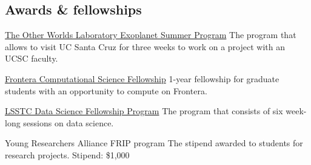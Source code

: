 \documentclass[10pt]{article} %
\begin{document}
\begin{paracol}{1}


\section{Awards \& fellowships}





	
	{\href{https://owl.ucsc.edu/summer/}{The Other Worlds Laboratory Exoplanet Summer Program}} %
	{The program that allows to visit UC Santa Cruz for three weeks to work on a project with an UCSC faculty.} %

	{\href{https://frontera-portal.tacc.utexas.edu/fellowship/}{Frontera Computational Science Fellowship}} %
	{1-year fellowship for graduate students with an opportunity to compute on Frontera.} %

	{\href{https://www.lsstcorporation.org/fellowship_program}{LSSTC Data Science Fellowship Program}} %
	{The program that consists of six week-long sessions on data science.} %
	
	{Young Researchers Alliance FRIP program}
	{The stipend awarded to students for research projects. Stipend: \$1,000}
	

\end{paracol}
\end{document}
